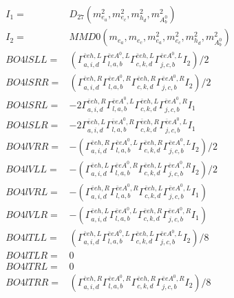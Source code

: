 \documentclass[A4,landscape]{article}
\begin{document}
\begin{align} 
I_1 = & D_{27}(m^2_{e_{{a}}}, m^2_{e_{{c}}}, m^2_{h_{{d}}}, m^2_{A^0_{{b}}}) \\ 
I_2 = & MMD0(m_{e_{{a}}}, m_{e_{{c}}}, m^2_{e_{{a}}}, m^2_{e_{{c}}}, m^2_{h_{{d}}}, m^2_{A^0_{{b}}}) \\ 
  BO4lSLL= & ( \Gamma^{\bar{e}e h ,L}_{a, i, d} \Gamma^{\bar{e}e A^0 ,L}_{l, a, b} \Gamma^{\bar{e}e h ,L}_{c, k, d} \Gamma^{\bar{e}e A^0 ,L}_{j, c, b} I_2)/2 \\ 
  BO4lSRR= & ( \Gamma^{\bar{e}e h ,R}_{a, i, d} \Gamma^{\bar{e}e A^0 ,R}_{l, a, b} \Gamma^{\bar{e}e h ,R}_{c, k, d} \Gamma^{\bar{e}e A^0 ,R}_{j, c, b} I_2)/2 \\ 
  BO4lSRL= & -2  \Gamma^{\bar{e}e h ,R}_{a, i, d} \Gamma^{\bar{e}e A^0 ,L}_{l, a, b} \Gamma^{\bar{e}e h ,L}_{c, k, d} \Gamma^{\bar{e}e A^0 ,R}_{j, c, b} I_1 \\ 
  BO4lSLR= & -2  \Gamma^{\bar{e}e h ,L}_{a, i, d} \Gamma^{\bar{e}e A^0 ,R}_{l, a, b} \Gamma^{\bar{e}e h ,R}_{c, k, d} \Gamma^{\bar{e}e A^0 ,L}_{j, c, b} I_1 \\ 
  BO4lVRR= & -( \Gamma^{\bar{e}e h ,R}_{a, i, d} \Gamma^{\bar{e}e A^0 ,L}_{l, a, b} \Gamma^{\bar{e}e h ,R}_{c, k, d} \Gamma^{\bar{e}e A^0 ,L}_{j, c, b} I_2)/2 \\ 
  BO4lVLL= & -( \Gamma^{\bar{e}e h ,L}_{a, i, d} \Gamma^{\bar{e}e A^0 ,R}_{l, a, b} \Gamma^{\bar{e}e h ,L}_{c, k, d} \Gamma^{\bar{e}e A^0 ,R}_{j, c, b} I_2)/2 \\ 
  BO4lVRL= & -( \Gamma^{\bar{e}e h ,R}_{a, i, d} \Gamma^{\bar{e}e A^0 ,R}_{l, a, b} \Gamma^{\bar{e}e h ,L}_{c, k, d} \Gamma^{\bar{e}e A^0 ,L}_{j, c, b} I_1) \\ 
  BO4lVLR= & -( \Gamma^{\bar{e}e h ,L}_{a, i, d} \Gamma^{\bar{e}e A^0 ,L}_{l, a, b} \Gamma^{\bar{e}e h ,R}_{c, k, d} \Gamma^{\bar{e}e A^0 ,R}_{j, c, b} I_1) \\ 
  BO4lTLL= & ( \Gamma^{\bar{e}e h ,L}_{a, i, d} \Gamma^{\bar{e}e A^0 ,L}_{l, a, b} \Gamma^{\bar{e}e h ,L}_{c, k, d} \Gamma^{\bar{e}e A^0 ,L}_{j, c, b} I_2)/8 \\ 
  BO4lTLR= & 0 \\ 
  BO4lTRL= & 0 \\ 
  BO4lTRR= & ( \Gamma^{\bar{e}e h ,R}_{a, i, d} \Gamma^{\bar{e}e A^0 ,R}_{l, a, b} \Gamma^{\bar{e}e h ,R}_{c, k, d} \Gamma^{\bar{e}e A^0 ,R}_{j, c, b} I_2)/8 \\ 
\end{align} 
\end{document}
